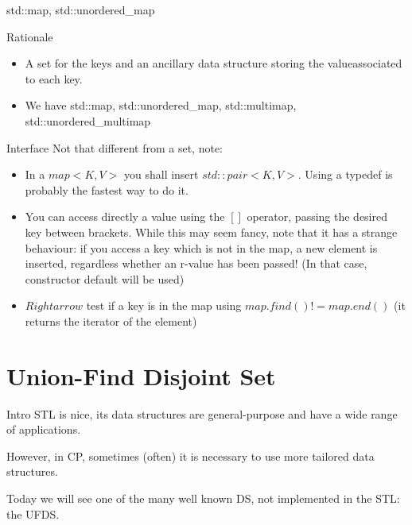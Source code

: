 \documentclass[compress]{beamer}
\begin{document}
\begin{frame}{std::map, std::unordered\_map}
    \begin{block}{Rationale}
        \begin{itemize}
            \item A set for the keys and an ancillary data structure storing the valueassociated to each key.
            \item We have std::map, std::unordered\_map, std::multimap, std::unordered\_multimap
        \end{itemize}
    \end{block}
\end{frame}

\begin{frame}{}
    \begin{block}{Interface}
        Not that different from a set, note:
        \begin{itemize}
            \item In a $map<K, V>$ you shall insert $std::pair<K, V>$. Using a typedef is probably the fastest way to do it.
            \item You can access directly a value using the $[ ]$ operator, passing the desired key between brackets. While this may seem fancy, note that it has a strange behaviour: if you access a key which is not in the map, a new element is inserted, regardless whether an r-value has been passed! (In that case, constructor default will be used)
            \item $Rightarrow$ test if a key is in the map using $map.find() != map.end()$ (it returns the iterator of the element)
        \end{itemize}
    \end{block}

\end{frame}
\section{Union-Find Disjoint Set}

\begin{frame}{Intro}
    STL is nice, its data structures are general-purpose and have a wide range of applications.
    
    However, in CP, sometimes (often) it is necessary to use more tailored data structures.
    
    Today we will see one of the many well known DS, not implemented in the STL: the UFDS.
\end{frame}
\end{document}
